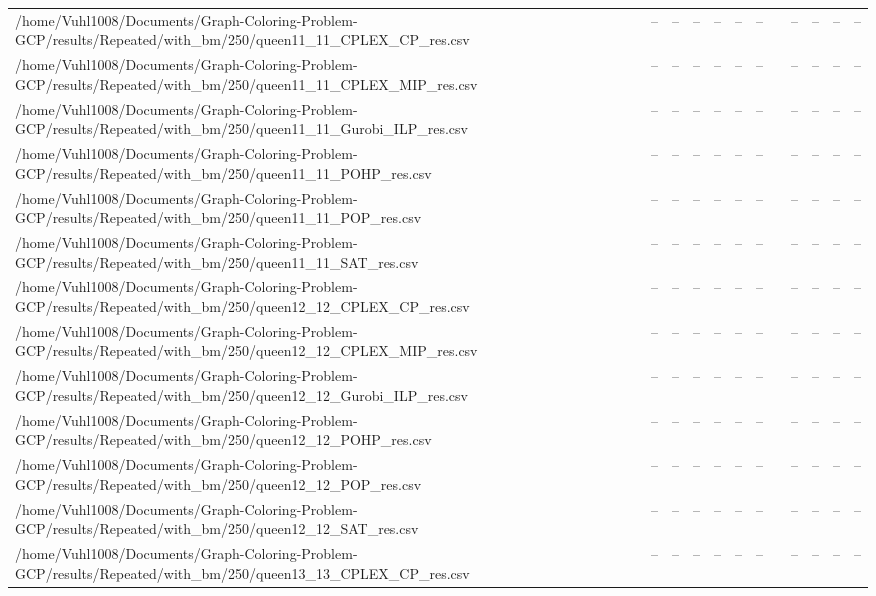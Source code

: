\begin{table}[htbp]
\begin{tabular}{llllllllllll}
/home/Vuhl1008/Documents/Graph-Coloring-Problem-GCP/results/Repeated/with\_bm/250/queen11\_11\_CPLEX\_CP\_res.csv & -- & -- & -- & -- & -- & -- & {} & -- & -- & -- & -- \\
/home/Vuhl1008/Documents/Graph-Coloring-Problem-GCP/results/Repeated/with\_bm/250/queen11\_11\_CPLEX\_MIP\_res.csv & -- & -- & -- & -- & -- & -- & {} & -- & -- & -- & -- \\
/home/Vuhl1008/Documents/Graph-Coloring-Problem-GCP/results/Repeated/with\_bm/250/queen11\_11\_Gurobi\_ILP\_res.csv & -- & -- & -- & -- & -- & -- & {} & -- & -- & -- & -- \\
/home/Vuhl1008/Documents/Graph-Coloring-Problem-GCP/results/Repeated/with\_bm/250/queen11\_11\_POHP\_res.csv & -- & -- & -- & -- & -- & -- & {} & -- & -- & -- & -- \\
/home/Vuhl1008/Documents/Graph-Coloring-Problem-GCP/results/Repeated/with\_bm/250/queen11\_11\_POP\_res.csv & -- & -- & -- & -- & -- & -- & {} & -- & -- & -- & -- \\
/home/Vuhl1008/Documents/Graph-Coloring-Problem-GCP/results/Repeated/with\_bm/250/queen11\_11\_SAT\_res.csv & -- & -- & -- & -- & -- & -- & {} & -- & -- & -- & -- \\
/home/Vuhl1008/Documents/Graph-Coloring-Problem-GCP/results/Repeated/with\_bm/250/queen12\_12\_CPLEX\_CP\_res.csv & -- & -- & -- & -- & -- & -- & {} & -- & -- & -- & -- \\
/home/Vuhl1008/Documents/Graph-Coloring-Problem-GCP/results/Repeated/with\_bm/250/queen12\_12\_CPLEX\_MIP\_res.csv & -- & -- & -- & -- & -- & -- & {} & -- & -- & -- & -- \\
/home/Vuhl1008/Documents/Graph-Coloring-Problem-GCP/results/Repeated/with\_bm/250/queen12\_12\_Gurobi\_ILP\_res.csv & -- & -- & -- & -- & -- & -- & {} & -- & -- & -- & -- \\
/home/Vuhl1008/Documents/Graph-Coloring-Problem-GCP/results/Repeated/with\_bm/250/queen12\_12\_POHP\_res.csv & -- & -- & -- & -- & -- & -- & {} & -- & -- & -- & -- \\
/home/Vuhl1008/Documents/Graph-Coloring-Problem-GCP/results/Repeated/with\_bm/250/queen12\_12\_POP\_res.csv & -- & -- & -- & -- & -- & -- & {} & -- & -- & -- & -- \\
/home/Vuhl1008/Documents/Graph-Coloring-Problem-GCP/results/Repeated/with\_bm/250/queen12\_12\_SAT\_res.csv & -- & -- & -- & -- & -- & -- & {} & -- & -- & -- & -- \\
/home/Vuhl1008/Documents/Graph-Coloring-Problem-GCP/results/Repeated/with\_bm/250/queen13\_13\_CPLEX\_CP\_res.csv & -- & -- & -- & -- & -- & -- & {} & -- & -- & -- & -- \\

\end{tabular}
\end{table}
